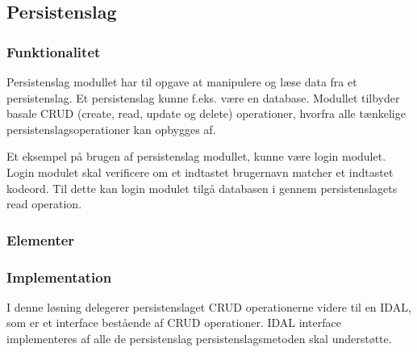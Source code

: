 \subsection{Persistenslag}
\label{sub:persistenslag}

\subsubsection{Funktionalitet}
\label{ssub:Funktionalitet}


Persistenslag modullet har til opgave at manipulere og læse data fra et persistenslag. Et persistenslag kunne f.eks. være en database. Modullet tilbyder basale CRUD (create, read, update og delete) operationer, hvorfra alle tænkelige persistenslagsoperationer kan opbygges af.

Et eksempel på brugen af persistenslag modullet, kunne være login modulet. Login modulet skal verificere om et indtastet brugernavn matcher et indtastet kodeord. Til dette kan login modulet tilgå databasen i gennem persistenslagets read operation.

\subsubsection{Elementer}
\label{ssub:Elementer}



\subsubsection{Implementation}
\label{ssub:Implementation}

I denne løsning delegerer persistenslaget CRUD operationerne videre til en IDAL, som er et interface bestående af CRUD operationer. IDAL interface implementeres af alle de persistenslag persistenslagsmetoden skal understøtte.

